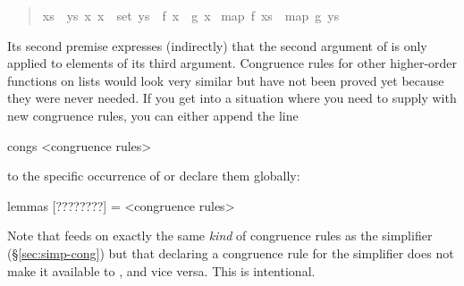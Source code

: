 \begin{isabelle}
\begin{isamarkuptext}
\begin{quote}
\begin{isabelle}%
{\isasymlbrakk}\mbox{xs}\ {\isacharequal}\ \mbox{ys}{\isacharsemicolon}\ {\isasymAnd}\mbox{x}{\isachardot}\ \mbox{x}\ {\isasymin}\ set\ \mbox{ys}\ {\isasymLongrightarrow}\ \mbox{f}\ \mbox{x}\ {\isacharequal}\ \mbox{g}\ \mbox{x}{\isasymrbrakk}\isanewline
{\isasymLongrightarrow}\ map\ \mbox{f}\ \mbox{xs}\ {\isacharequal}\ map\ \mbox{g}\ \mbox{ys}
\end{isabelle}%

\end{quote}
Its second premise expresses (indirectly) that the second argument of
 is only applied to elements of its third argument. Congruence
rules for other higher-order functions on lists would look very similar but
have not been proved yet because they were never needed. If you get into a
situation where you need to supply  with new congruence
rules, you can either append the line
\begin{ttbox}
congs <congruence rules>
\end{ttbox}
to the specific occurrence of  or declare them globally:
\begin{ttbox}
lemmas [????????] = <congruence rules>
\end{ttbox}

Note that  feeds on exactly the same \emph{kind} of
congruence rules as the simplifier (\S\ref{sec:simp-cong}) but that
declaring a congruence rule for the simplifier does not make it
available to , and vice versa. This is intentional.%
\end{isamarkuptext}%
\end{isabelle}%
